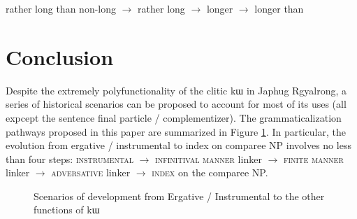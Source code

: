 \documentclass[oldfontcommands,oneside,a4paper,11pt]{article}
\newcommand{\ipa}[1]{{\phon #1}} %
\begin{document}
  \begin{exe}
\ex \label{ex:adv2comp}
\glt rather long than non-long $\rightarrow$ rather long $\rightarrow$   longer $\rightarrow$ longer than
\end{exe}
  
 


  \section{Conclusion}
Despite the extremely polyfunctionality of the    clitic \ipa{kɯ} in Japhug Rgyalrong, a series of historical scenarios can be proposed to account for most of its uses (all expcept the sentence final particle / complementizer). The grammaticalization pathways  proposed in this paper are summarized in Figure \ref{fig:scenario}. In particular, the evolution from ergative / instrumental to index on comparee NP involves no less than four steps: \textsc{instrumental} $\rightarrow$ \textsc{infinitival manner} linker $\rightarrow$  \textsc{finite manner} linker $\rightarrow$  \textsc{adversative} linker $\rightarrow$  \textsc{index} on the comparee NP.

   \begin{figure}
   \caption{Scenarios of development from Ergative / Instrumental to the other functions of \ipa{kɯ}} \label{fig:scenario}  
\end{figure}
\end{document}
